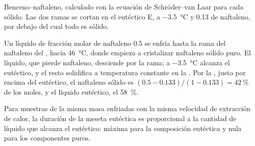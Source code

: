 \begin{omfigure}

{\small Benceno--naftaleno, calculado con la ecuación de Schröder--van Laar
para cada sólido. Las dos ramas se cortan en el eutéctico E,
a \qty{-3.5}{\degreeCelsius} y 0.13 de naftaleno, por debajo del cual todo es sólido.}
\end{omfigure}

\begin{example}\label{ex:b2:solid-liquid-diagrams:naphthalene}
Un líquido de fracción molar de naftaleno 0.5 se enfría hasta la rama del naftaleno
del , hacia \qty{46}{\degreeCelsius}, donde empieza a cristalizar naftaleno sólido
puro. El líquido, que pierde naftaleno, desciende por la
rama; a \qty{-3.5}{\degreeCelsius} alcanza el eutéctico, y el resto
solidifica a temperatura constante en la . Por la ,
justo por encima del eutéctico, el naftaleno sólido es $(0.5 - 0.133)/(1 - 0.133) =
42~\%$ de los moles, y el líquido eutéctico, el 58~\%.
\end{example}

\begin{proposition}\label{prop:b2:solid-liquid-diagrams:plateau-length}
Para muestras de la misma masa enfriadas con la misma velocidad de extracción de calor, la
duración de la meseta eutéctica es proporcional a la cantidad de líquido que
alcanza el eutéctico: máxima para la composición eutéctica y nula para los
componentes puros.
\end{proposition}

